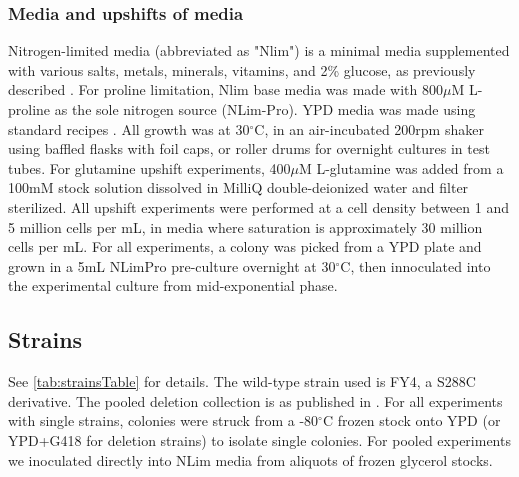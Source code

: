 \subsubsection{Media and upshifts of media}

Nitrogen-limited media (abbreviated as "Nlim") is a minimal media
supplemented with various salts, metals, minerals, vitamins, and
2\% glucose, as previously described
\parencite{airoldi2016steady,brauer2008coordination}. 
For proline limitation, 
Nlim base media was made with 800$\mu$M L-proline as the sole
nitrogen source (NLim-Pro).
YPD media was made using standard recipes \parencite{amberg2005methods}.
All growth was at 30$^{\circ}$C, in an air-incubated 200rpm shaker  
using baffled flasks with foil caps, or roller drums for 
overnight cultures in test tubes.
For glutamine upshift experiments, 
400$\mu$M L-glutamine was added from a 100mM stock solution dissolved 
in MilliQ double-deionized water and filter sterilized.
All upshift experiments were
performed at a cell density between 1 and 5 million cells per mL,
in media where saturation is approximately 30 million cells per mL. 
For all experiments, 
a colony was picked from a YPD plate and grown in a 5mL NLimPro 
pre-culture overnight at 30$^{\circ}$C, then innoculated into
the experimental culture from mid-exponential phase.

\subsection{Strains}

See \autoref{tab:strainsTable} for details.  
The wild-type strain used is FY4, a S288C derivative. 
The pooled deletion collection is as published in 
\cite{vandersluis2014broad}.
For all experiments with single strains, colonies were struck 
from a -80$^{\circ}$C frozen stock onto YPD (or YPD+G418 for
deletion strains) to isolate single colonies.
For pooled experiments we inoculated directly into NLim media
from aliquots of frozen glycerol stocks.

